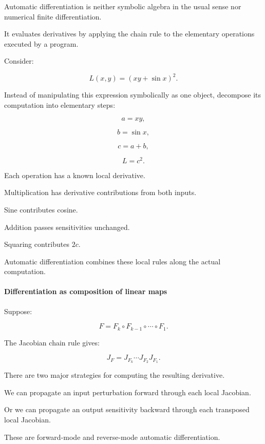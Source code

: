 \hypertarget{02-foundations-ii-ch022-automatic-differentiation-differentiating-the-programs-operations}{}

Automatic differentiation is neither symbolic algebra in the usual sense nor numerical finite differentiation.

It evaluates derivatives by applying the chain rule to the elementary operations executed by a program.

Consider:

\[
L(x,y)=\left(xy+\sin x\right)^2.
\]

Instead of manipulating this expression symbolically as one object, decompose its computation into elementary steps:

\[
a=xy,
\]

\[
b=\sin x,
\]

\[
c=a+b,
\]

\[
L=c^2.
\]

Each operation has a known local derivative.

Multiplication has derivative contributions from both inputs.

Sine contributes cosine.

Addition passes sensitivities unchanged.

Squaring contributes \(2c\).

Automatic differentiation combines these local rules along the actual computation.

\paragraph{Differentiation as composition of linear maps}\label{02-foundations-ii-ch022-differentiation-as-composition-of-linear-maps}

\hypertarget{02-foundations-ii-ch022-differentiation-as-composition-of-linear-maps}{}

Suppose:

\[
F=F_k\circ F_{k-1}\circ\cdots\circ F_1.
\]

The Jacobian chain rule gives:

\[
J_F = J_{F_k}\cdots J_{F_2}J_{F_1}.
\]

There are two major strategies for computing the resulting derivative.

We can propagate an input perturbation forward through each local Jacobian.

Or we can propagate an output sensitivity backward through each transposed local Jacobian.

These are forward-mode and reverse-mode automatic differentiation.

